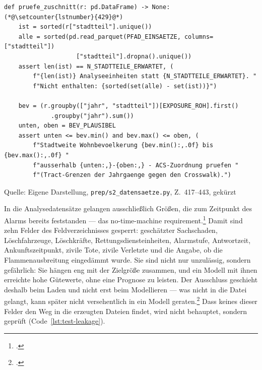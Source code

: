 \documentclass[12pt,a4paper]{article}
\newcommand{\tabquelle}[1][Eigene Darstellung]{%
  \par\setlength{\parskip}{0pt}\vspace{3pt}%
  {\setstretch{1}\fontsize{9pt}{11pt}\selectfont\raggedright Quelle: #1\par}%
}
\begin{document}
\begin{quellcode}[htbp]
\caption{Prüfung von Zuschnitt und Wohnbevölkerung}
\label{lst:zuschnitt}\vspace{-3.5pt}
\begin{lstlisting}[style=pythonstil,firstnumber=417]
def pruefe_zuschnitt(r: pd.DataFrame) -> None:(*@\setcounter{lstnumber}{429}@*)
    ist = sorted(r["stadtteil"].unique())
    alle = sorted(pd.read_parquet(PFAD_EINSAETZE, columns=["stadtteil"])
                    ["stadtteil"].dropna().unique())
    assert len(ist) == N_STADTTEILE_ERWARTET, (
        f"{len(ist)} Analyseeinheiten statt {N_STADTTEILE_ERWARTET}. "
        f"Nicht enthalten: {sorted(set(alle) - set(ist))}")

    bev = (r.groupby(["jahr", "stadtteil"])[EXPOSURE_ROH].first()
             .groupby("jahr").sum())
    unten, oben = BEV_PLAUSIBEL
    assert unten <= bev.min() and bev.max() <= oben, (
        f"Stadtweite Wohnbevoelkerung {bev.min():,.0f} bis {bev.max():,.0f} "
        f"ausserhalb {unten:,}-{oben:,} - ACS-Zuordnung pruefen "
        f"(Tract-Grenzen der Jahrgaenge gegen den Crosswalk).")
\end{lstlisting}
\tabquelle[Eigene Darstellung, \texttt{prep/s2\_datensaetze.py}, Z.~417--443, gekürzt]
\end{quellcode}
 
In die Analysedatensätze gelangen ausschließlich Größen, die zum Zeitpunkt des
Alarms bereits feststanden --- das no-time-machine
requirement.\footcite[559]{Kaufman2011} Damit sind zehn Felder des
Feldverzeichnisses gesperrt: geschätzter Sachschaden, Löschfahrzeuge,
Löschkräfte, Rettungsdiensteinheiten, Alarmstufe, Antwortzeit, Ankunftszeitpunkt, zivile Tote, zivile Verletzte und die Angabe, ob die Flammenausbreitung eingedämmt wurde. Sie sind nicht nur unzulässig,
sondern gefährlich: Sie hängen eng mit der Zielgröße zusammen, und ein Modell
mit ihnen erreichte hohe Gütewerte, ohne eine Prognose zu leisten. Der
Ausschluss geschieht deshalb beim Laden und nicht erst beim Modellieren ---
was nicht in die Datei gelangt, kann später nicht versehentlich in ein Modell
geraten.\footcite[560]{Kaufman2011} Dass keines dieser Felder den Weg in die
erzeugten Dateien findet, wird nicht behauptet, sondern geprüft
(Code~\ref{lst:test-leakage}).
 
\end{document}
